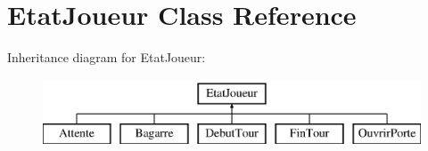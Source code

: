 \hypertarget{class_etat_joueur}{\section{Etat\-Joueur Class Reference}
\label{class_etat_joueur}
}
Inheritance diagram for Etat\-Joueur\-:\begin{figure}[H]
\begin{center}
\leavevmode
\includegraphics[height=2.000000cm]{class_etat_joueur}
\end{center}
\end{figure}
